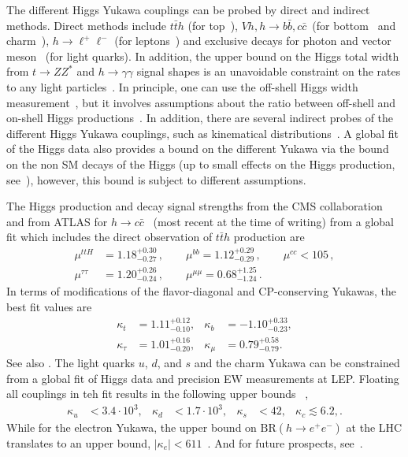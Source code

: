 \documentclass[../report.tex]{subfiles}
\begin{document}
The different Higgs Yukawa couplings can be probed by direct and indirect methods. 
Direct methods include $t\bar{t}h$ (for top~\cite{}), $Vh, h\to b\bar{b}, c\bar{c} $~(for bottom~\cite{} and charm~\cite{}), $h\to \ell^+ \ell^-$ (for leptons~\cite{}) and exclusive decays for photon and vector meson~\cite{} (for light quarks). 
In addition, the upper bound on the Higgs total width from $t\to ZZ^*$ and $h\to\gamma\gamma$ signal shapes is an unavoidable constraint on the rates to any light particles~\cite{Perez:2015aoa}.
In principle, one can use the off-shell Higgs width measurement~\cite{1405.0285,Englert:2014ffa}, but it involves assumptions about the ratio between off-shell and on-shell Higgs productions~\cite{}. 
In addition, there are several indirect probes of the different Higgs Yukawa couplings, such as kinematical distributions~\cite{Soreq:2016rae,Bishara:2016jga}.
A global fit of the Higgs data also provides a bound on the different Yukawa via the bound on the non SM decays of the Higgs (up to small effects on the Higgs production, see~\cite{Delaunay:2013pja,Kagan:2014ila,Perez:2015aoa}), however, this bound is subject to different assumptions. 




The Higgs production and decay signal strengths from the CMS collaboration~\cite{Sirunyan:2018koj} and from ATLAS for $h\to c\bar{c}$~\cite{Aaboud:2018fhh} (most recent at the time of writing) from a global fit which includes the direct observation of $t\bar t h$ production are
\begin{align}
    \mu^{ttH} &= 1.18^{+0.30}_{-0.27}\, ,\qquad \mu^{bb}=1.12^{+0.29}_{-0.29}\, , \qquad
    \mu^{cc} < 105 \, , \nonumber\\ \mu^{\tau\tau} &= 1.20^{+0.26}_{-0.24}\, ,\qquad   \mu^{\mu\mu}=0.68^{+1.25}_{-1.24}\,.
\end{align}
In terms of modifications of the flavor-diagonal and CP-conserving Yukawas,  the best fit values are
\begin{align}
\label{eq:kappalimits}
    \kappa_t &= 1.11^{+0.12}_{-0.10}, & \kappa_b &= -1.10^{+0.33}_{-0.23},\nonumber\\
    \kappa_\tau &= 1.01^{+0.16}_{-0.20}, & \kappa_\mu &= 0.79^{+0.58}_{-0.79}.
\end{align}
See also \cite{CMS-PAS-HIG-15-002,CMS-PAS-HIG-17-031}.
The light quarks $u$, $d$, and $s$ and the charm Yukawa can be constrained from a global fit of Higgs data and precision EW measurements at LEP. Floating all couplings in teh fit results in the following upper bounds~ \cite{Perez:2015aoa,Kagan:2014ila},
\begin{align}
\kappa_u&<3.4 \cdot 10^{3},  &\kappa_d&<1.7 \cdot 10^3, &\kappa_s&< 42, & \kappa_c \lesssim 6.2,\nonumber.
\end{align}
While for the electron Yukawa, the upper bound on $\mbox{BR}(h\to e^+e^-)$ at the LHC translates to an upper bound, $|\kappa_e|<611$~\cite{Khachatryan:2014aep,Altmannshofer:2015qra}. And for future prospects, see~\cite{Perez:2015lra,Brivio:2015fxa,Koenig:2015pha,Aad:2015sda,Bodwin:2014bpa,Bodwin:2013gca}.
\end{document}
